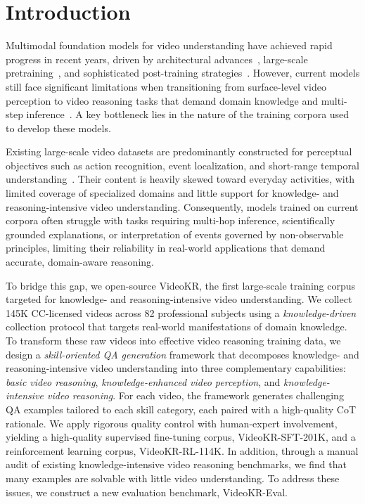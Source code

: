 \documentclass{llmxive}
\providecommand{\data}{VideoKR\xspace}
\providecommand{\eval}{VideoKR-Eval\xspace}
\providecommand{\sftdata}{VideoKR-SFT-201K\xspace}
\providecommand{\rldata}{VideoKR-RL-114K\xspace}
\begin{document}
\section{Introduction}
\label{sec:intro}
Multimodal foundation models for video understanding have achieved rapid progress in recent years, driven by architectural advances~\cite{shu2025video, zohar2025apollo, ren2025vamba, li2024unimoescalingunifiedmultimodal, 11353361}, large-scale pretraining~\cite{Zhang2025VideoLLaMA3F, Wang2025InternVideo25EV, Qwen2.5-VL, chen2025eagle}, and sophisticated post-training strategies~\cite{videor1, Open-o3, videorft, videochatr1, li2025veripocultivatinglongreasoning}. However,  current models still face significant limitations when transitioning from surface-level video perception to video reasoning tasks that demand domain knowledge and multi-step inference~\cite{mmvu, videommmu, scivideobench, song2025video}.
A key bottleneck lies in the nature of the training corpora used to develop these models. 

Existing large-scale video datasets are predominantly constructed for perceptual objectives such as action recognition, event localization, and short-range temporal understanding~\cite{videor1, videorft, Open-o3, TVGR1, scaling}. Their content is heavily skewed toward everyday activities, with limited coverage of specialized domains and little support for knowledge- and reasoning-intensive video understanding.
Consequently, models trained on current corpora often struggle with tasks requiring multi-hop inference, scientifically grounded explanations, or interpretation of events governed by non-observable principles, limiting their reliability in real-world applications that demand accurate, domain-aware reasoning.

To bridge this gap, we open-source \data, the first large-scale training corpus targeted for knowledge- and reasoning-intensive video understanding. 
We collect 145K CC-licensed videos across 82 professional subjects using a \emph{knowledge-driven} collection protocol that targets real-world manifestations of domain knowledge.
To transform these raw videos into effective video reasoning training data, we design a \emph{skill-oriented QA generation} framework that decomposes knowledge- and reasoning-intensive video understanding into three complementary capabilities: \emph{basic video reasoning}, \emph{knowledge-enhanced video perception}, and \emph{knowledge-intensive video reasoning}. For each video, the framework generates challenging QA examples tailored to each skill category, each paired with a high-quality CoT rationale.
We apply rigorous quality control with human-expert involvement, yielding a high-quality supervised fine-tuning corpus, \sftdata, and a reinforcement learning corpus, \rldata.
In addition, through a manual audit of existing knowledge-intensive video reasoning benchmarks, we find that many examples are solvable with little video understanding. To address these issues, we construct a new evaluation benchmark, \eval.
\end{document}
